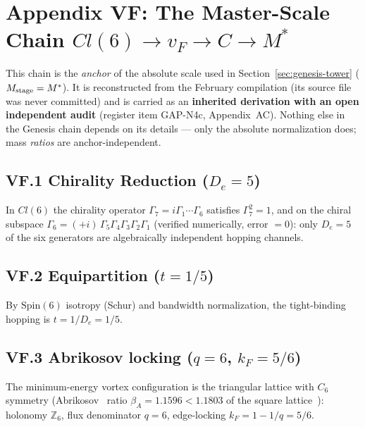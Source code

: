 \section{Appendix VF: The Master-Scale Chain $Cl(6)\to v_F\to C\to M^*$}
\label{app:VF}

\begin{mdframed}[backgroundcolor=yellow!8, frametitle={Status note (2026)}]
This chain is the \emph{anchor} of the absolute scale used in Section~\ref{sec:genesis-tower}
($M_{\rm stage}=M^*$). It is reconstructed from the February compilation (its source file was
never committed) and is carried as an \textbf{inherited derivation with an open independent
audit} (register item GAP-N4c, Appendix~AC). Nothing else in the Genesis chain depends on its
details --- only the absolute normalization does; mass \emph{ratios} are anchor-independent.
\end{mdframed}

\subsection*{VF.1 Chirality Reduction ($D_e=5$)}
In $Cl(6)$ the chirality operator $\Gamma_7=i\Gamma_1\cdots\Gamma_6$ satisfies
$\Gamma_7^2=1$, and on the chiral subspace
$\Gamma_6=(+i)\,\Gamma_5\Gamma_4\Gamma_3\Gamma_2\Gamma_1$ (verified numerically, error $=0$):
only $D_e=5$ of the six generators are algebraically independent hopping channels.

\subsection*{VF.2 Equipartition ($t=1/5$)}
By $\mathrm{Spin}(6)$ isotropy (Schur) and bandwidth normalization, the tight-binding hopping
is $t=1/D_e=1/5$.

\subsection*{VF.3 Abrikosov locking ($q=6$, $k_F=5/6$)}
The minimum-energy vortex configuration is the triangular lattice with $C_6$ symmetry
(Abrikosov~\cite{abrikosov1957} ratio $\beta_A=1.1596<1.1803$ of the square lattice~\cite{kleiner1964}): holonomy $\mathbb{Z}_6$,
flux denominator $q=6$, edge-locking $k_F=1-1/q=5/6$.

